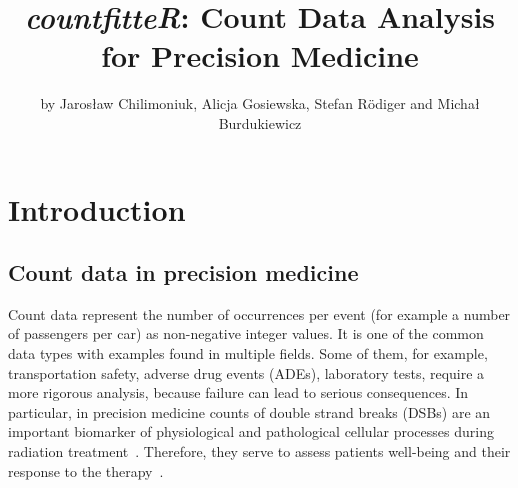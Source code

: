\def\arraystretch{2.5}
\title{\emph{countfitteR}: Count Data Analysis for Precision Medicine}
\author{by Jaros\l{}aw Chilimoniuk, Alicja Gosiewska, Stefan R\"{o}diger and Micha\l{} Burdukiewicz}

\maketitle


\section{Introduction}
\subsection{Count data in precision medicine}

Count data represent the number of occurrences per event (for example a number of passengers per car) as non-negative integer values. It is one of the common data types with examples found in multiple fields. Some of them, for example, transportation safety, adverse drug events (ADEs), laboratory tests, require a more rigorous analysis, because failure can lead to serious consequences. In particular, in precision medicine counts of double strand breaks (DSBs) are an important biomarker of physiological and pathological cellular processes during radiation treatment~\citep{LomaxBiologicalconsequencesradiationinduced2013}. Therefore, they serve to assess patients well-being and their response to the therapy~\citep{reddig_dna_2018}.


